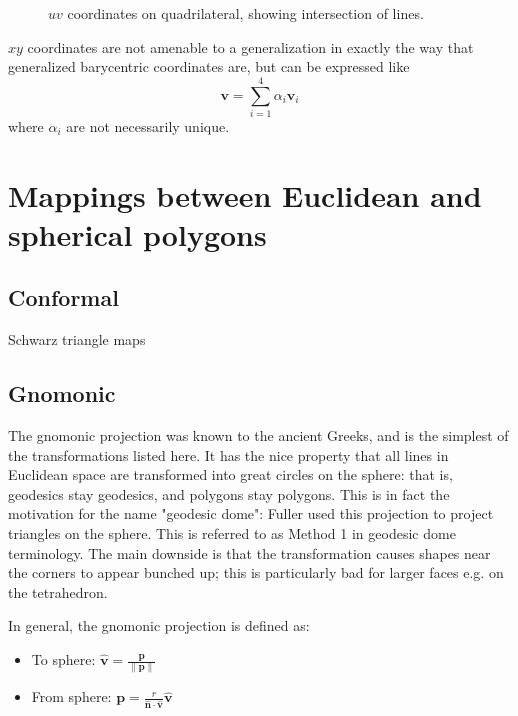 \documentclass{amsart}[12pt]
\begin{document}
\begin{figure}%
\caption{$uv$ coordinates on quadrilateral, showing intersection of lines.}
\label{fig:uv}
\end{figure}

$xy$ coordinates are not amenable to a generalization in exactly the way that
generalized barycentric coordinates are, but can be expressed like
\begin{equation}
  \mathbf v = \sum^4_{i=1} \alpha_i \mathbf v_i
\end{equation}
where $\alpha_i$ are not necessarily unique.

\section{Mappings between Euclidean and spherical polygons}
\subsection{Conformal}

Schwarz triangle maps

\subsection{Gnomonic}
The gnomonic projection was known to the ancient Greeks, and is the simplest
of the transformations listed here. It has the nice property that all lines in
Euclidean space are transformed into great circles on the sphere: that is,
geodesics stay geodesics, and polygons stay polygons. This is in fact the
motivation for the name "geodesic dome": Fuller used this projection to project
triangles on the sphere. This is referred to as Method 1 in geodesic dome
terminology. The main downside is that the transformation causes shapes
near the corners to appear bunched up;
this is particularly bad for larger faces e.g. on the tetrahedron.

In general, the gnomonic projection is defined as:
\begin{itemize}
\item To sphere: $\hat{\mathbf v} = \frac{\mathbf p}{\|\mathbf p\|}$
\item From sphere: $\mathbf p = \frac{r}
  {\hat{\mathbf n} \cdot \hat{\mathbf v}}\hat{\mathbf v}$
\end{itemize}
\end{document}
